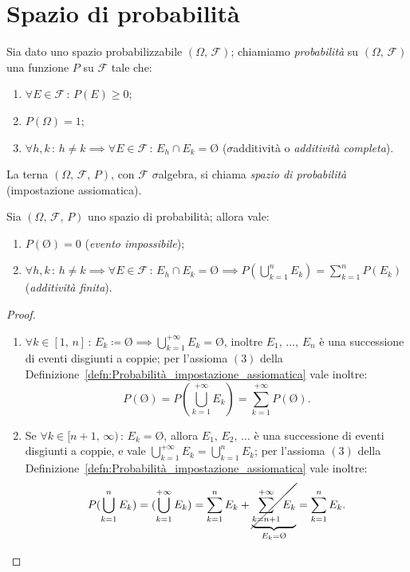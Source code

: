     \section{Spazio di probabilità}
        \begin{defn}\label{defn:Probabilità_impostazione_assiomatica}
            Sia dato uno spazio probabilizzabile $(\Omega,\,\mathscr{F})$; chiamiamo \emph{probabilità} su $(\Omega,\,\mathscr{F})$ una funzione $P$ su $\mathscr{F}$ tale che:
            \begin{enumerate}
                \item $\forall E \in \mathscr{F}\,:\,P(E) \geq 0$;
                \item $P(\Omega) = 1$;
                \item $\forall h,k\,:\,h \neq k \implies \forall E \in \mathscr{F}\,:\,E_h \cap E_k = \text{\O}$ ($\sigma$\nbdash additività o \emph{additività completa}).
            \end{enumerate}
        La terna $(\Omega,\,\mathscr{F},\,P)$, con $\mathscr{F}$ $\sigma$\nbdash algebra, si chiama \emph{spazio di probabilità} (impostazione assiomatica).
        \end{defn}
        \begin{prty}\label{prty:Spazio_di_probabilità}
            Sia $(\Omega,\,\mathscr{F},\,P)$ uno spazio di probabilità; allora vale:
            \begin{enumerate}
                \item $P(\text{\O}) = 0$ (\emph{evento impossibile});
                \item $\forall h,k\,:\,h \neq k \implies \forall E \in \mathscr{F}\,:\,E_h \cap E_k = \text{\O} \implies P(\bigcup_{k=1}^{n} E_k) = \sum_{k=1}^{n} P(E_k)$ (\emph{additività finita}).
            \end{enumerate}
        \end{prty}
        \begin{proof}
            \hfill
            \begin{enumerate}
                \item $\forall k \in [1,\,n]\,:\,E_k \coloneqq \text{\O} \implies \bigcup_{k=1}^{+\infty} E_k = \text{\O}$, inoltre $E_1,\,\ldots,\,E_n$ è una successione di eventi disgiunti a coppie; per l'assioma $(3)$ della Definizione~\ref{defn:Probabilità_impostazione_assiomatica} vale inoltre: \[
                        P\left(\text{\O}\right) = P\left(\bigcup_{k=1}^{+\infty} E_k\right) = \sum_{k=1}^{+\infty} P\left(\text{\O}\right)
                .\] 
            \item Se $\forall k \in [n+1,\,\infty)\,:\,E_k = \text{\O}$, allora $E_1,\,E_2,\,\ldots$ è una successione di eventi disgiunti a coppie, e vale $\bigcup_{k=1}^{+\infty} E_k = \bigcup_{k=1}^{n} E_k$; per l'assioma $(3)$ della Definizione~\ref{defn:Probabilità_impostazione_assiomatica} vale inoltre: \[
                    P(\bigcup_{k=1}^{n} E_k) = (\bigcup_{k=1}^{+\infty} E_k) = \sum_{k=1}^{n} E_k + \underset{E_k = \text{\O}}{\underbrace{\cancel{\sum_{k=n+1}^{+\infty} E_k}}} = \sum_{k=1}^{n} E_k
            . \qedhere\]
            \end{enumerate}
        \end{proof}
